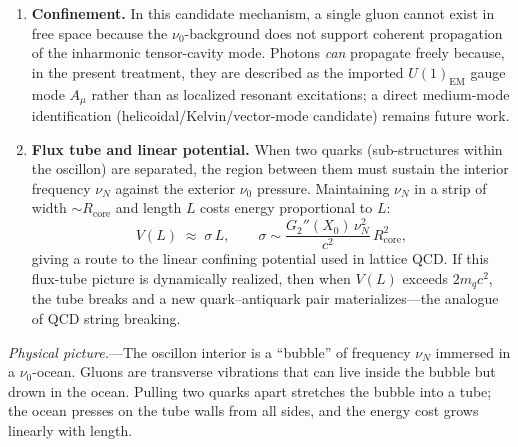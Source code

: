 \documentclass[11pt]{article}
\begin{document}
\begin{enumerate}
  \item \textbf{Confinement.}\;
    In this candidate mechanism, a single gluon
    cannot exist in free space because the
    $\nu_0$-background does not support coherent
    propagation of the inharmonic tensor-cavity
    mode.
    Photons \emph{can} propagate freely because,
    in the present treatment, they are described
    as the imported $U(1)_{\mathrm{EM}}$ gauge
    mode $A_\mu$ rather than as localized resonant
    excitations; a direct medium-mode
    identification (helicoidal/Kelvin/vector-mode
    candidate) remains future work.

  \item \textbf{Flux tube and linear potential.}\;
    When two quarks (sub-structures within the
    oscillon) are separated, the region between
    them must sustain the interior frequency
    $\nu_N$ against the exterior $\nu_0$ pressure.
    Maintaining $\nu_N$ in a strip of width
    $\sim R_{\mathrm{core}}$ and length $L$
    costs energy proportional to $L$:
    \begin{equation}\label{eq:flux_tube}
      V(L) \;\approx\; \sigma\,L, \qquad
      \sigma \sim
      \frac{G_2''(X_0)\,\nu_N^2}{c^2}\,
      R_{\mathrm{core}}^2,
    \end{equation}
    giving a route to the linear confining
    potential used in lattice QCD.  If this
    flux-tube picture is dynamically realized,
    then when $V(L)$ exceeds $2m_q c^2$, the tube
    breaks and a new quark--antiquark pair
    materializes---the analogue of QCD string
    breaking.
\end{enumerate}

\textit{Physical picture.}---The oscillon interior
is a ``bubble'' of frequency $\nu_N$ immersed
in a $\nu_0$-ocean.  Gluons are transverse
vibrations that can live inside the bubble but
drown in the ocean.  Pulling two quarks apart
stretches the bubble into a tube; the ocean
presses on the tube walls from all sides, and
the energy cost grows linearly with length.
\end{document}

